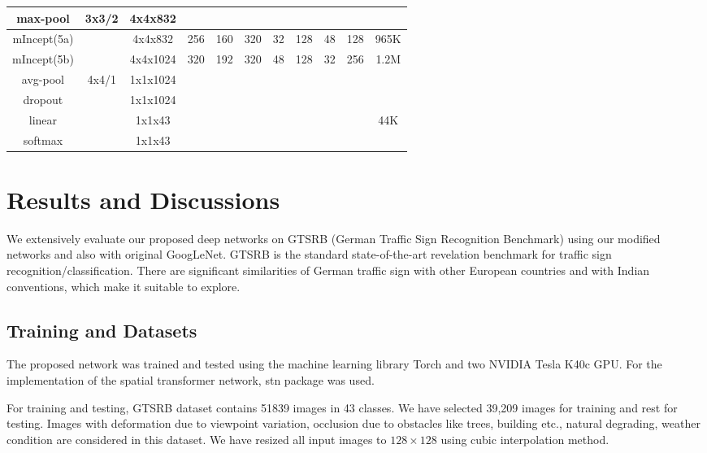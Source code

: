 \documentclass[conference]{IEEEtran}
\begin{document}
\begin{table*}[t]
\begin{tabular}{|c|c|c|c|c|c|c|c|c|c|c|}
 \hline
 max-pool & 3x3/2 & 4x4x832   &  &   &   &   &   &  & &  \\
 \hline
 mIncept(5a) & &  4x4x832 & 256  & 160  & 320  & 32  & 128 & 48& 128& 965K \\
 \hline
 mIncept(5b) &  &    4x4x1024 & 320 & 192  & 320  & 48  & 128  & 32 & 256 & 1.2M \\
 \hline
 avg-pool & 4x4/1 &  1x1x1024  &  &   &   &   &   &  & &  \\
 \hline
 dropout &  &  1x1x1024   &  &   &   &   &   &  & &  \\
 \hline
 linear &  &  1x1x43  &  &   &   &   &   &  &  & 44K \\
 \hline
 softmax &  &  1x1x43  &  &   &   &   &   &  &  &  \\

\hline
 \end{tabular}
\end{table*}

\section{Results and Discussions}
We extensively evaluate our proposed deep networks on GTSRB (German Traffic Sign Recognition Benchmark) \cite{gtsrb} using our modified networks and also with original GoogLeNet. GTSRB is the standard state-of-the-art revelation benchmark for traffic sign recognition/classification. There are significant similarities of German traffic sign with other European countries and with Indian conventions, which make it suitable to explore. 
\subsection{Training and Datasets}
The proposed network was trained and tested using the machine learning library Torch \cite{torch} and two NVIDIA Tesla K40c GPU. For the implementation of the spatial transformer network, stn \cite{stnp} package was used.

For training and testing, GTSRB dataset contains 51839 images in 43 classes. We have selected 39,209 images for training and rest for testing. Images with deformation due to viewpoint variation, occlusion due to obstacles like trees, building etc., natural degrading, weather condition are considered in this dataset. We have resized all input images to $ 128 \times 128 $ using cubic interpolation method. 
\end{document}
